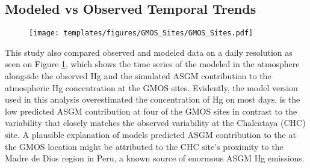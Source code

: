 
\subsection{Modeled vs Observed Temporal Trends}
\begin{figure}[H]
\texttt{[image: templates/figures/GMOS\_Sites/GMOS\_Sites.pdf]}
\centering
{}
\label{fig:GMOSvsGC}
\end{figure}
\FloatBarrier


\begin{flushleft}


 This study also compared observed and modeled data on a daily resolution as seen on Figure \ref{fig:GMOSvsGC}, which shows the time series of the modeled \hgc in the atmosphere alongside the observed Hg and the simulated ASGM contribution to the atmospheric Hg concentration at the GMOS sites. Evidently, the \gc model version used in this analysis overestimated the concentration of Hg on most days.   is the low predicted ASGM contribution at  four of the GMOS sites in contrast to the variability that closely matches the observed variability at the Chalcataya (CHC) site. A plausible explanation of models predicted ASGM contribution to the \hg at the GMOS location might be attributed to the CHC site's proximity to the Madre de Dios region in Peru, a known source of enormous ASGM Hg emissions. 
\end{flushleft}


